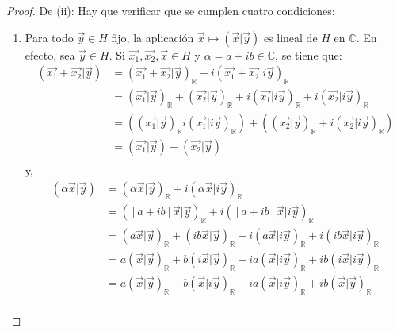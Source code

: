 \documentclass[12pt]{report}
\theoremstyle{largebreak}
\newcommand\pint[2]{\ensuremath{\left(#1\big|#2\right)}}
\begin{document}
\begin{proof}
        De (ii): Hay que verificar que se cumplen cuatro condiciones:
        \begin{enumerate}
            \item Para todo $\vec{y}\in H$ fijo, la aplicación $\vec{x}\mapsto\pint{\vec{x}}{\vec{y}}$ es lineal de $H$ en $\mathbb{C}$. En efecto, sea $\vec{y}\in H$. Si $\vec{x_1},\vec{x_2},\vec{x}\in H$ y $\alpha=a+ib\in\mathbb{C}$, se tiene que:
            \begin{equation*}
                \begin{split}
                    \pint{\vec{x_1}+\vec{x_2}}{\vec{y}}&=\pint{\vec{x_1}+\vec{x_2}}{\vec{y}}_{\mathbb{R}}+i\pint{\vec{x_1}+\vec{x_2}}{i\vec{y}}_{\mathbb{R}}\\
                    &=\pint{\vec{x_1}}{\vec{y}}_{\mathbb{R}}+\pint{\vec{x_2}}{\vec{y}}_{\mathbb{R}}+i\pint{\vec{x_1}}{i\vec{y}}_{\mathbb{R}}+i\pint{\vec{x_2}}{i\vec{y}}_{\mathbb{R}}\\
                    &=(\pint{\vec{x_1}}{\vec{y}}_{\mathbb{R}}i\pint{\vec{x_1}}{i\vec{y}}_{\mathbb{R}})+(\pint{\vec{x_2}}{\vec{y}}_{\mathbb{R}}+i\pint{\vec{x_2}}{i\vec{y}}_{\mathbb{R}})\\
                    &=\pint{\vec{x_1}}{\vec{y}}+\pint{\vec{x_2}}{\vec{y}}\\
                \end{split}
            \end{equation*}
            y,
            \begin{equation*}
                \begin{split}
                    \pint{\alpha\vec{x}}{\vec{y}}&=\pint{\alpha\vec{x}}{\vec{y}}_{\mathbb{R}}+i\pint{\alpha\vec{x}}{i\vec{y}}_{\mathbb{R}}\\
                    &=\pint{[a+ib]\vec{x}}{\vec{y}}_{\mathbb{R}}+i\pint{[a+ib]\vec{x}}{i\vec{y}}_{\mathbb{R}}\\
                    &=\pint{a\vec{x}}{\vec{y}}_{\mathbb{R}}+\pint{ib\vec{x}}{\vec{y}}_{\mathbb{R}}+i\pint{a\vec{x}}{i\vec{y}}_{\mathbb{R}}+i\pint{ib\vec{x}}{i\vec{y}}_{\mathbb{R}}\\
                    &=a\pint{\vec{x}}{\vec{y}}_{\mathbb{R}}+b\pint{i\vec{x}}{\vec{y}}_{\mathbb{R}}+ia\pint{\vec{x}}{i\vec{y}}_{\mathbb{R}}+ib\pint{i\vec{x}}{i\vec{y}}_{\mathbb{R}}\\
                    &=a\pint{\vec{x}}{\vec{y}}_{\mathbb{R}}-b\pint{\vec{x}}{i\vec{y}}_{\mathbb{R}}+ia\pint{\vec{x}}{i\vec{y}}_{\mathbb{R}}+ib\pint{\vec{x}}{\vec{y}}_{\mathbb{R}}\\

\end{split}
\end{equation*}
\end{enumerate}
\end{proof}
\end{document}

